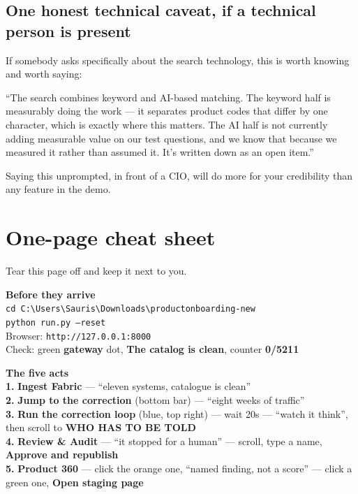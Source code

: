 \documentclass[11pt,a4paper]{article}
\newcommand{\ui}[1]{\textbf{#1}}          %
\begin{document}
\subsection{One honest technical caveat, if a technical person is present}

If somebody asks specifically about the search technology, this is worth
knowing and worth saying:

\begin{say}
``The search combines keyword and AI-based matching. The keyword half is
measurably doing the work --- it separates product codes that differ by one
character, which is exactly where this matters. The AI half is not currently
adding measurable value on our test questions, and we know that because we
measured it rather than assumed it. It's written down as an open item.''
\end{say}

Saying this unprompted, in front of a CIO, will do more for your credibility
than any feature in the demo.

\section{One-page cheat sheet}

Tear this page off and keep it next to you.

\vspace{0.6em}
\begin{tcolorbox}[colback=shell,colframe=quiet,boxrule=0.4pt,arc=2pt]
\textbf{Before they arrive}\\[2pt]
\texttt{cd C:\textbackslash Users\textbackslash Sauris\textbackslash Downloads\textbackslash productonboarding-new}\\
\texttt{python run.py --reset}\\
Browser: \texttt{http://127.0.0.1:8000}\\
Check: green \ui{gateway} dot, \ui{The catalog is clean}, counter \ui{0/5211}
\end{tcolorbox}

\vspace{0.4em}
\begin{tcolorbox}[colback=white,colframe=accent,boxrule=1pt,arc=2pt]
\textbf{The five acts}\\[4pt]
\textbf{1.} \ui{Ingest Fabric} --- ``eleven systems, catalogue is clean'' \\[3pt]
\textbf{2.} \ui{Jump to the correction} (bottom bar) --- ``eight weeks of
traffic'' \\[3pt]
\textbf{3.} \ui{Run the correction loop} (blue, top right) --- wait 20s ---
``watch it think'', then scroll to \ui{WHO HAS TO BE TOLD} \\[3pt]
\textbf{4.} \ui{Review \& Audit} --- ``it stopped for a human'' --- scroll,
type a name, \ui{Approve and republish} \\[3pt]
\textbf{5.} \ui{Product 360} --- click the orange one, ``named finding, not a
score'' --- click a green one, \ui{Open staging page}
\end{tcolorbox}
\end{document}
